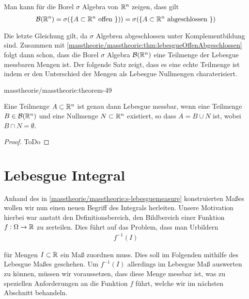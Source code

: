 \par
Man kann für die Borel \(\sigma\) Algebra von \(\mathbb{R}^n\) zeigen, dass gilt
\begin{align*}
\mathcal{B}(\mathbb{R}^n) = \sigma(\lbrace A \subset \mathbb{R}^n \text{ offen }\rbrace) ) = \sigma(\lbrace A \subset \mathbb{R}^n \text{ abgeschlossen }\rbrace)
\end{align*}
\par
Die letzte Gleichung gilt, da \(\sigma\) Algebren abgeschlossen unter Komplementbildung sind.
Zusammen mit \cref{masstheorie/masstheorie:thm:lebesgueOffenAbgeschlossen} folgt dann schon, dass die Borel \(\sigma\) Algebra \(\mathcal{B}(\mathbb{R}^n)\) eine Teilmenge der Lebesgue messbaren Mengen ist.
Der folgende Satz zeigt, dass es eine echte Teilmenge ist indem er den Unterschied der Mengen als Lebesgue Nullmengen charaterisiert.
\begin{theorem}{}{masstheorie/masstheorie:theorem-49}



\par
Eine Teilmenge \(A \subset \mathbb{R}^n\) ist genau dann Lebesgue messbar, wenn eine Teilmenge \(B \in \mathcal{B}(\mathbb{R}^n)\) und eine Nullmenge \(N \subset \mathbb{R}^n\) existiert, so dass \(A = B \cup N\) ist, wobei \(B\cap N=\emptyset\).
\end{theorem}

\begin{proof}
 ToDo
\end{proof}


\section{Lebesgue Integral}
\label{\detokenize{masstheorie/lebesgue_integral:lebesgue-integral}}\label{\detokenize{masstheorie/lebesgue_integral::doc}}
\par
Anhand des in \cref{masstheorie/masstheorie:s-lebesguemeasure}  konstruierten Maßes wollen wir nun einen neuen Begriff des Integrals herleiten. Unsere Motivation hierbei war anstatt den Definitionsbereich, den Bildbereich einer Funktion \(f:\Omega\to\mathbb{R}\) zu zerteilen. Dies führt auf das Problem, dass man Urbildern
\begin{align*}
f^{-1}(I)
\end{align*}
\par
für Mengen \(I\subset\mathbb{R}\) ein Maß zuordnen muss. Dies soll im Folgenden mithilfe des Lebesgue Maßes geschehen. Um \(f^{-1}(I)\) allerdings im Lebesgue Maß auswerten zu können, müssen wir voraussetzen, dass diese Menge messbar ist, was zu speziellen Anforderungen an die Funktion \(f\) führt, welche wir im nächsten Abschnitt behandeln.



